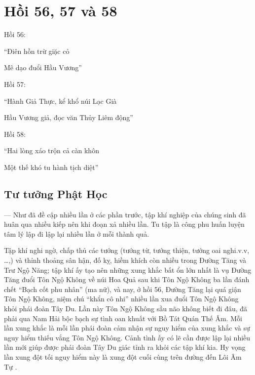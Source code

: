 \chapter{Hồi 56, 57 và 58} %
\label{cha:hoi_56_57}

Hồi 56:

\begin{itshape}
``Điên hồn trừ giặc cỏ

Mê dạo đuổi Hầu Vương''
\end{itshape}

Hồi 57:

\begin{itshape}
``Hành Giả Thực, kể khổ núi Lạc Già

Hầu Vương giả, đọc văn Thủy Liêm động''
\end{itshape}

Hồi 58:

\begin{itshape}
``Hai lòng xáo trộn cả càn khôn

Một thế khó tu hành tịch diệt''
\end{itshape}

\section{Tư tưởng Phật Học} %
\label{sec:56_57_phat_hoc}

— Như đã đề cập nhiều lần ở các phần trước, tập khí nghiệp của chúng sinh đã huân qua nhiều kiếp nên khi đoạn xả nhiều lần. Tu tập là công phu huấn luyện tâm lý lập đi lập lại nhiều lần ở mỗi thành quả.

Tập khí nghi ngờ, chấp thủ các tướng (tướng từ, tướng thiện, tướng oai nghi.v.v, \ldots,) và thỉnh thoảng sân hận, đố kỵ, hiềm khích còn nhiều trong Đường Tăng và Trư Ngộ Năng; tập khí ấy tạo nên những xung khắc bất ổn lớn nhất là vụ Đường Tăng đuổi Tôn Ngộ Không về núi Hoa Quả sau khi Tôn Ngộ Không ba lần đánh chết ``Bạch cốt phu nhân'' (ma nữ), và nay, ở hồi 56, Đường Tăng lại quá giận Tôn Ngộ Không, niệm chú ``khẩn cô nhi'' nhiều lần xua đuổi Tôn Ngộ Không khỏi phái đoàn Tây Du. Lần này Tôn Ngộ Không sầu não không biết đi đâu, đã phải qua Nam Hải bộc bạch sự tình oan khuất với Bồ Tát Quán Thế Âm. Mỗi lần xung khắc là mỗi lần phái đoàn cảm nhận sự nguy hiểm của xung khắc và sự nguy hiểm thiếu vắng Tôn Ngộ Không. Cảnh tình ấy có lẽ cần được lập lại nhiều lần mới giúp được phái đoàn Tây Du giác tỉnh ra khỏi các tập khí kia. Hy vọng lần xung đột tối nguy hiểm này là xung đột cuối cùng trên đường đến Lôi Âm Tự .

